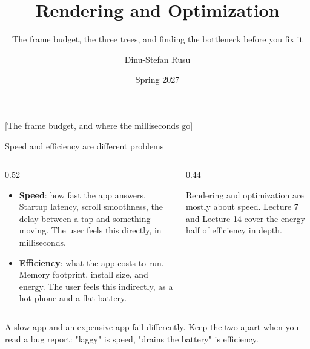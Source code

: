 \documentclass[10pt,aspectratio=169,t]{beamer}
\title{Rendering and Optimization}
\subtitle{The frame budget, the three trees, and finding the bottleneck before you fix it}
\author{Dinu-Ștefan Rusu}
\institute{FILS, Universitatea Politehnica București}
\date{Spring 2027}
\begin{document}
\titleframe


[The frame budget, and where the milliseconds go]

\begin{frame}[eyebrow=Performance]{Speed and efficiency are different problems}
  \begin{columns}[T]
    \begin{column}{0.52\textwidth}
      \begin{itemize}
        \item \textbf{Speed}: how fast the app answers. Startup latency, scroll smoothness, the delay between a tap and something moving. The user feels this directly, in milliseconds.
        \item \textbf{Efficiency}: what the app costs to run. Memory footprint, install size, and energy. The user feels this indirectly, as a hot phone and a flat battery.
      \end{itemize}
    \end{column}
    \begin{column}{0.44\textwidth}
      \begin{hint}
        Rendering and optimization are mostly about speed. Lecture 7 and Lecture 14 cover the energy half of efficiency in depth.
      \end{hint}
    \end{column}
  \end{columns}
  \begin{takeaway}{A slow app and an expensive app fail differently.}
    Keep the two apart when you read a bug report: "laggy" is speed, "drains the battery" is efficiency.
  \end{takeaway}
\end{frame}
\end{document}
